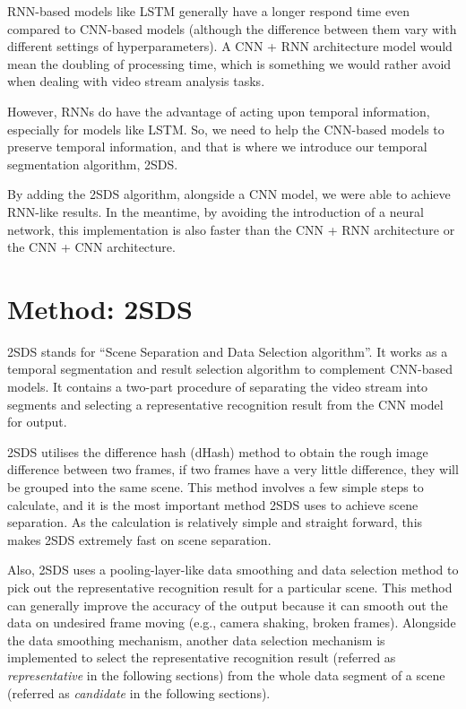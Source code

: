 \documentclass[
twocolumn,
]{ceurart}
\begin{document}
RNN-based models like LSTM \cite{DBLP:journals/neco/HochreiterS97} generally have a longer respond time even compared to CNN-based models (although the difference between them vary with different settings of hyperparameters). A CNN + RNN architecture model would mean the doubling of processing time, which is something we would rather avoid when dealing with video stream analysis tasks.

However, RNNs do have the advantage of acting upon temporal information, especially for models like LSTM. So, we need to help the CNN-based models to preserve temporal information, and that is where we introduce our temporal segmentation algorithm, 2SDS.

By adding the 2SDS algorithm, alongside a CNN model, we were able to achieve RNN-like results. In the meantime, by avoiding the introduction of a neural network, this implementation is also faster than the CNN + RNN architecture or the CNN + CNN architecture.

\section{Method: 2SDS}
2SDS stands for “Scene Separation and Data Selection algorithm”. It works as a temporal segmentation and result selection algorithm to complement CNN-based models. It contains a two-part procedure of separating the video stream into segments and selecting a representative recognition result from the CNN model for output.

2SDS utilises the difference hash (dHash) method \cite{Krawetz} to obtain the rough image difference between two frames, if two frames have a very little difference, they will be grouped into the same scene. This method involves a few simple steps to calculate, and it is the most important method 2SDS uses to achieve scene separation. As the calculation is 
relatively simple and straight forward, this makes 2SDS extremely fast on scene separation.

Also, 2SDS uses a pooling-layer-like data smoothing and data selection method to pick out the representative recognition result for a particular scene. This method can generally improve the accuracy of the output because it can smooth out the data on undesired frame moving (e.g., camera shaking, broken frames). Alongside the data smoothing mechanism, another data selection mechanism is implemented to select the representative recognition result (referred as \emph{representative} in the following sections) from the whole data segment of a scene (referred as \emph{candidate} in the following sections).
\end{document}
